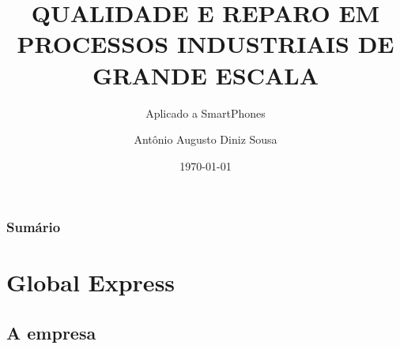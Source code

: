 \documentclass[aspectratio=169]{beamer}
\begin{document}
	\title[3º Relatório de Acompanhamento do Estagiário]{QUALIDADE E REPARO EM PROCESSOS INDUSTRIAIS DE GRANDE ESCALA}
	\subtitle{Aplicado a SmartPhones}
	\author[antonioaads@gmail.com]{Antônio Augusto Diniz Sousa}
	\date[2017]{\today}
	
	\begin{frame}
		\titlepage
	\end{frame}
	\begin{frame}
		\frametitle{Sum\'{a}rio}
		\tableofcontents%
	\end{frame}
	
	\section{Global Express}
	\subsection{A empresa}
	
\end{document}
